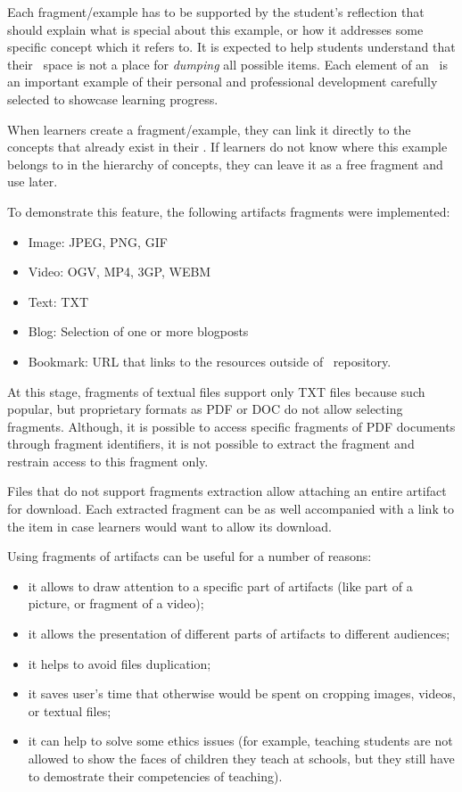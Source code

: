 Each fragment/example has to be supported by the student's reflection that
should explain what is special about this example, or how it addresses some
specific concept which it refers to. It is expected to help students understand
that their \ep~space is not a place for \textit{dumping} all possible items.
Each element of an \ep~is an important example of their personal and
professional development carefully selected to showcase learning progress.

When learners create a fragment/example, they can link it directly to the
concepts that already exist in their \ep. If learners do not know where this
example belongs to in the hierarchy of concepts, they can leave it as a free
fragment and use later.

To demonstrate this feature, the following artifacts fragments were implemented:

\begin{itemize}
  \item Image: JPEG, PNG, GIF
  \item Video: OGV, MP4, 3GP, WEBM
  \item Text: TXT
  \item Blog: Selection of one or more blogposts
  \item Bookmark: URL that links to the resources outside of \ep~repository.
\end{itemize} 

At this stage, fragments of textual files support only TXT files because such
popular, but proprietary formats as PDF or DOC do not allow selecting fragments.
Although, it is possible to access specific fragments of PDF documents through
fragment identifiers, it is not possible to extract the fragment and restrain
access to this fragment only.

Files that do not support fragments extraction allow attaching an entire
artifact for download. Each extracted fragment can be as well accompanied with a
link to the item in case learners would want to allow its download.

Using fragments of artifacts can be useful for a number of reasons:
\begin{itemize}
  \item it allows to draw attention to a specific part of artifacts (like part
  of a picture, or fragment of a video);
  \item it allows the presentation of different parts of artifacts to different
  audiences;
  \item it helps to avoid files duplication;
  \item it saves user's time that otherwise would be spent on cropping images,
  videos, or textual files;
  \item it can help to solve some ethics issues (for example, teaching students
  are not allowed to show the faces of children they teach at schools, but they
  still have to demostrate their competencies of teaching).
\end{itemize}

